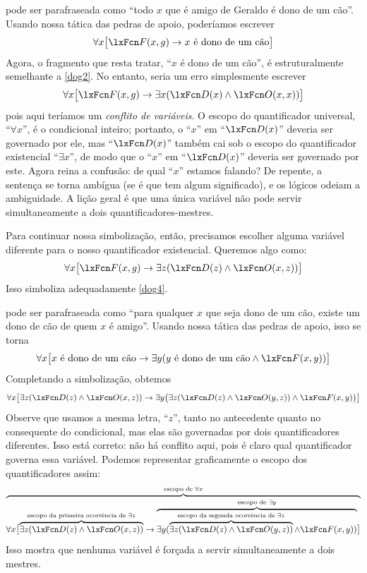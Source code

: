  pode ser parafraseada como \textquotedblleft todo $x$ que é amigo de Geraldo é dono de um cão\textquotedblright{}. Usando nossa tática das pedras de apoio, poderíamos escrever
$$\forall x \bigl[\atom{F}{x,g} \eif x \text{ é dono de um cão}\bigr]$$
Agora, o fragmento que resta tratar, \textquotedblleft $x$ é dono de um cão\textquotedblright{}, é estruturalmente semelhante a \cref*{dog2}. No entanto, seria um erro simplesmente escrever
$$\forall x \bigl[\atom{F}{x,g} \eif \exists x(\atom{D}{x} \eand \atom{O}{x,x})\bigr]$$
pois aqui teríamos um \emph{conflito de variáveis}. O escopo do quantificador universal, \textquotedblleft $\forall x$\textquotedblright{}, é o condicional inteiro; portanto, o \textquotedblleft $x$\textquotedblright{} em \textquotedblleft $\atom{D}{x}$\textquotedblright{} deveria ser governado por ele, mas \textquotedblleft $\atom{D}{x}$\textquotedblright{} também cai sob o escopo do quantificador existencial \textquotedblleft $\exists x$\textquotedblright{}, de modo que o \textquotedblleft $x$\textquotedblright{} em \textquotedblleft $\atom{D}{x}$\textquotedblright{} deveria ser governado por este. Agora reina a confusão: de qual \textquotedblleft $x$\textquotedblright{} estamos falando? De repente, a sentença se torna ambígua (se é que tem algum significado), e os lógicos odeiam a ambiguidade. A lição geral é que uma única variável não pode servir simultaneamente a dois quantificadores-mestres.

Para continuar nossa simbolização, então, precisamos escolher alguma variável diferente para o nosso quantificador existencial. Queremos algo como:
$$\forall x\bigl[\atom{F}{x,g} \eif\exists z(\atom{D}{z} \eand \atom{O}{x,z})\bigr]$$
Isso simboliza adequadamente \cref*{dog4}.

 pode ser parafraseada como \textquotedblleft para qualquer $x$ que seja dono de um cão, existe um dono de cão de quem $x$ é amigo\textquotedblright{}. Usando nossa tática das pedras de apoio, isso se torna
$$\forall x\bigl[\mbox{$x$ é dono de um cão}\eif\exists y(\mbox{$y$ é dono de um cão}\eand \atom{F}{x,y})\bigr]$$
Completando a simbolização, obtemos
$$\forall x\bigl[\exists z(\atom{D}{z} \eand \atom{O}{x,z})\eif\exists y\bigl(\exists z(\atom{D}{z} \eand \atom{O}{y,z})\eand \atom{F}{x,y}\bigr)\bigr]$$
Observe que usamos a mesma letra, \textquotedblleft $z$\textquotedblright{}, tanto no antecedente quanto no consequente do condicional, mas elas são governadas por dois quantificadores diferentes. Isso está correto: não há conflito aqui, pois é claro qual quantificador governa essa variável. Podemos representar graficamente o escopo dos quantificadores assim:
$$\overbrace{\forall x\bigl[\overbrace{\exists z(\atom{D}{z} \eand \atom{O}{x,z})}^{\text{escopo da primeira ocorrência de }\exists z}\eif \overbrace{\exists y(\overbrace{\exists z(\atom{D}{z} \eand \atom{O}{y,z})}^{\text{escopo da segunda ocorrência de }\exists z}\eand \atom{F}{x,y})}^{\text{escopo de }\exists y}\bigr]}^{\text{escopo de }\forall x}$$
Isso mostra que nenhuma variável é forçada a servir simultaneamente a dois mestres.

